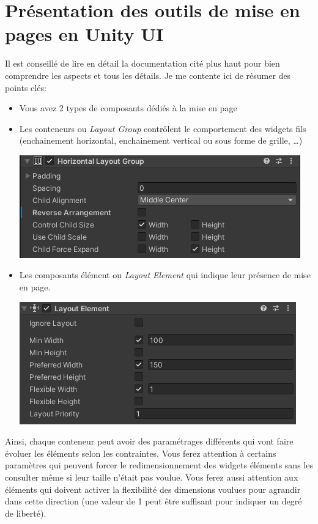 \documentclass[a4paper,10pt]{article}
\begin{document}
\section*{Présentation des outils de mise en pages en Unity UI}

Il est conseillé de lire en détail la documentation cité plus haut pour bien comprendre les aspects et tous les détails. Je me contente ici de résumer des points clés:
\begin{itemize}
	\item Vous avez 2 types de composants dédiés à la mise en page
	\item Les conteneurs ou \textit{Layout Group} contrôlent le comportement des widgets fils (enchainement horizontal, enchainement vertical ou sous forme de grille, \ldots)
\begin{center}
	\includegraphics[width=0.6\linewidth]{rc/ui_layout_group_horiz}
\end{center}	
	\item Les composants élément ou \textit{Layout Element} qui indique leur présence de mise en page.
\begin{center}
	\includegraphics[width=0.6\linewidth]{rc/ui_layout_element}
\end{center}
\end{itemize}

Ainsi, chaque conteneur peut avoir des paramétrages différents qui vont faire évoluer les éléments selon les contraintes. Vous ferez attention à certains paramètres qui peuvent forcer le redimensionnement des widgets éléments sans les consulter même si leur taille n'était pas voulue. Vous ferez aussi attention aux éléments qui doivent activer la flexibilité des dimensions voulues pour agrandir dans cette direction (une valeur de 1 peut être suffisant pour indiquer un degré de liberté).
\end{document}
